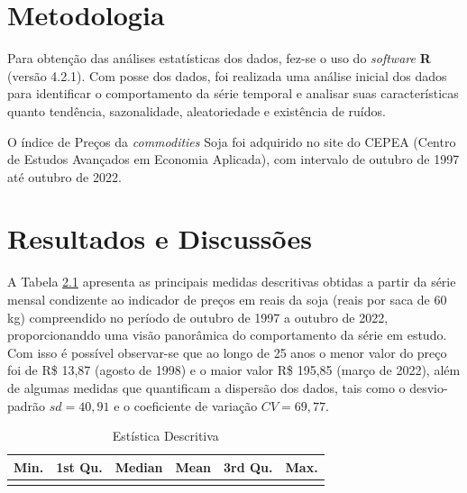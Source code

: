 \documentclass[
	12pt,				%
	openright,			%
	oneside,      %
	a4paper,			%
	english,			%
	french,				%
	spanish,			%
	brazil,				%
	]{abntex2}\usepackage[]{graphicx}\usepackage[table]{xcolor}
\newenvironment{knitrout}{}{} %
\theoremstyle{definition}
\theoremstyle{remark}
\begin{document}
\chapter{Metodologia}

Para obtenção das análises estatísticas dos dados, fez-se o uso do \textit{software} \textbf{R} (versão 4.2.1). Com posse dos dados, foi realizada uma análise inicial dos dados para identificar o comportamento da série temporal e analisar suas características  quanto tendência, sazonalidade, aleatoriedade e existência de ruídos.


O índice de Preços da \textit{commodities} Soja foi adquirido no site do CEPEA (Centro de Estudos Avançados em Economia Aplicada), com intervalo de outubro de 1997 até outubro de 2022.



\chapter{Resultados e Discussões}




A Tabela \ref{tab1} apresenta as principais medidas descritivas obtidas a partir da série mensal 
condizente ao indicador de preços em reais da soja (reais por saca de 60 kg) compreendido 
no período de outubro de 1997 a outubro de 2022, proporcionanddo uma visão panorâmica do comportamento da série em estudo.
Com isso é possível observar-se que ao longo de 25 anos o menor valor do preço foi de R\$ 13,87 (agosto de 1998) e o maior valor R\$ 195,85 (março de 2022), além de algumas medidas que quantificam a dispersão dos dados, tais como o desvio-padrão $sd = 40,91$ e o coeficiente de variação $CV = 69,77$.

\begin{knitrout}
\color{fgcolor}\begin{table}[!h]

\caption{\label{tab:script3}Estística Descritiva \label{tab1}}
\centering
\begin{tabular}[t]{rrrrrr}
\toprule
Min. & 1st Qu. & Median & Mean & 3rd Qu. & Max.\\
\midrule
\cellcolor{gray!6}{13.87} & \cellcolor{gray!6}{31.34} & \cellcolor{gray!6}{46.8} & \cellcolor{gray!6}{58.63} & \cellcolor{gray!6}{72.91} & \cellcolor{gray!6}{195.8}\\
\bottomrule
\end{tabular}
\end{table}

\end{knitrout}
\end{document}
